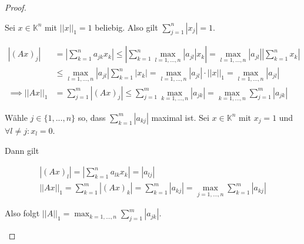 \documentclass[]{article}
\newcommand{\norm}[1]{\left|\left|#1\right|\right|}
\newcommand{\normone}[1]{\norm{#1}_1}
\newcommand{\maxz}[2]{\max_{#1=1,...,#2}}
\begin{document}
\begin{proof}
\begin{enumerate}[label=\alph*)]
		Sei $x\in\mathbb{K}^n$ mit $\normone{x}=1$ beliebig. Also gilt $\sum_{j=1}^{n}|x_j|=1$.
		
		\begin{align*}
			|(Ax)_j| &= \left|\sum_{k=1}^{n}a_{jk}x_k\right| \leq \left|\sum_{k=1}^{n}\maxz{l}{n}|a_{jl}|x_k\right| = \maxz{l}{n}|a_{jl}|\left|\sum_{k=1}^{n}x_k\right| \\  &\leq\maxz{l}{n}|a_{jl}|\sum_{k=1}^{n}|x_k| = \maxz{l}{n}|a_{jl}| \cdot \normone{x}
			= \maxz{l}{n}|a_{jl}| \\
			\implies \normone{Ax} &= \sum_{j=1}^{m}|(Ax)_j| \leq \sum_{j=1}^{m}\maxz{k}{n}|a_{jk}| = \maxz{k}{n}\sum_{j=1}^{m}|a_{jk}|
		\end{align*}
		
		Wähle $j\in\{1, ..., n\}$ so, dass $\sum_{k=1}^{m}|a_{kj}|$ maximal ist. Sei $x\in\mathbb{K}^n$ mit $x_j=1$ und $\forall l\neq j: x_l=0$.
		
		Dann gilt
		
		\begin{align*}
			|(Ax)_l| = \left|\sum_{k=1}^{n}a_{lk}x_k\right| = |a_{lj}| \\
			\normone{Ax} = \sum_{k=1}^{m}|(Ax)_k| = \sum_{k=1}^{m}|a_{kj}| = \maxz{j}{n} \sum_{k=1}^{m}|a_{kj}|
		\end{align*}
		
		Also folgt $\normone{A} = \maxz{k}{n}\sum_{j=1}^{m}|a_{jk}|$.
	\end{enumerate}
	

\end{proof}
\end{document}

